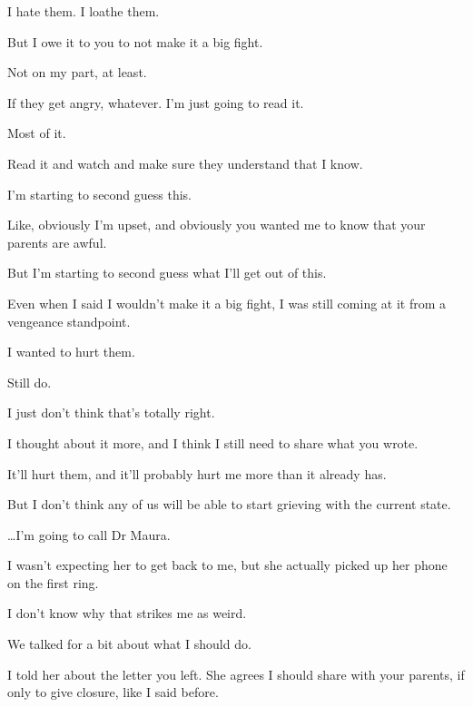 { I hate them. I loathe them.

 But I owe it to you to not make it a big fight.

 Not on my part, at least.

 If they get angry, whatever. I'm just going to read it.

 Most of it.

 Read it and watch and make sure they understand that I know.

 I'm starting to second guess this.

 Like, obviously I'm upset, and obviously you wanted me to know that your parents are awful.

 But I'm starting to second guess what I'll get out of this.

 Even when I said I wouldn't make it a big fight, I was still coming at it from a vengeance standpoint.

 I wanted to hurt them.

 Still do.

 I just don't think that's totally right.

 I thought about it more, and I think I still need to share what you wrote.

 It'll hurt them, and it'll probably hurt me more than it already has.

 But I don't think any of us will be able to start grieving with the current state.

\ldots{}I'm going to call Dr Maura.

 I wasn't expecting her to get back to me, but she actually picked up her phone on the first ring.

 I don't know why that strikes me as weird.

 We talked for a bit about what I should do.

 I told her about the letter you left. She agrees I should share with your parents, if only to give closure, like I said before.

}
